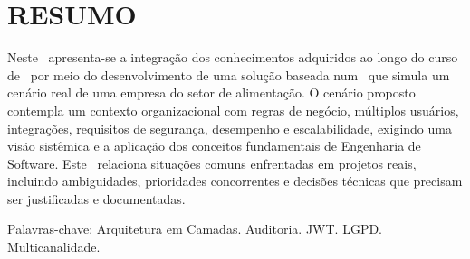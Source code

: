 \chapter*{RESUMO}

\noindent
Neste \titulo\ apresenta-se a integração dos conhecimentos adquiridos ao longo do curso
de \curso\ por meio do desenvolvimento de uma solução baseada num \tipotrabalho\
que simula um cenário real de uma empresa do setor de alimentação.
O cenário proposto contempla um contexto organizacional com regras de negócio, múltiplos usuários,
integrações, requisitos de segurança, desempenho e escalabilidade, exigindo uma visão sistêmica
e a aplicação dos conceitos fundamentais de Engenharia de Software.
Este \tipotrabalho\ relaciona situações comuns enfrentadas em projetos reais, incluindo ambiguidades,
prioridades concorrentes e decisões técnicas que precisam ser justificadas e documentadas.
\vspace{\baselineskip}

\noindent Palavras-chave: Arquitetura em Camadas. Auditoria. JWT. LGPD. Multicanalidade.

\newpage
